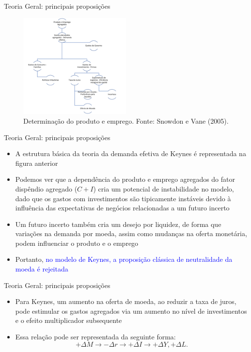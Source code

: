 \documentclass[10pt]{beamer}
\begin{document}
\begin{frame}{Teoria Geral: principais proposições}
    \begin{figure}
        \centering
        \includegraphics[width=0.5\textwidth]{./figures/aula4_fig5}
        \caption{Determinação do produto e emprego. Fonte: Snowdon e Vane (2005).}        
    \end{figure}
\end{frame}

\begin{frame}{Teoria Geral: principais proposições}
    \begin{itemize}
        \item A estrutura básica da teoria da demanda efetiva de Keynes é representada na figura anterior
        \bigskip
        \item Podemos ver que a dependência do produto e emprego agregados do fator dispêndio agregado ($C + I$) cria um potencial de instabilidade no modelo, dado que os gastos com investimentos são tipicamente instáveis devido à influência das expectativas de negócios relacionadas a um futuro incerto
        \bigskip
        \item Um futuro incerto também cria um desejo por liquidez, de forma que variações na demanda por moeda, assim como mudanças na oferta monetária, podem influenciar o produto e o emprego
        \bigskip
        \item Portanto, \textcolor{blue}{no modelo de Keynes, a proposição clássica de neutralidade da moeda é rejeitada}
    \end{itemize}
\end{frame}

\begin{frame}{Teoria Geral: principais proposições}
    \begin{itemize}
        \item Para Keynes, um aumento na oferta de moeda, ao reduzir a taxa de juros, pode estimular os gastos agregados via um aumento no nível de investimentos e o efeito multiplicador subsequente
        \bigskip
        \item Essa relação pode ser representada da seguinte forma:
        \begin{equation}
            +\Delta M \rightarrow -\Delta r \rightarrow +\Delta I \rightarrow +\Delta Y, +\Delta L.
            \label{eq7}
        \end{equation}
    \end{itemize}
\end{frame}
\end{document}
